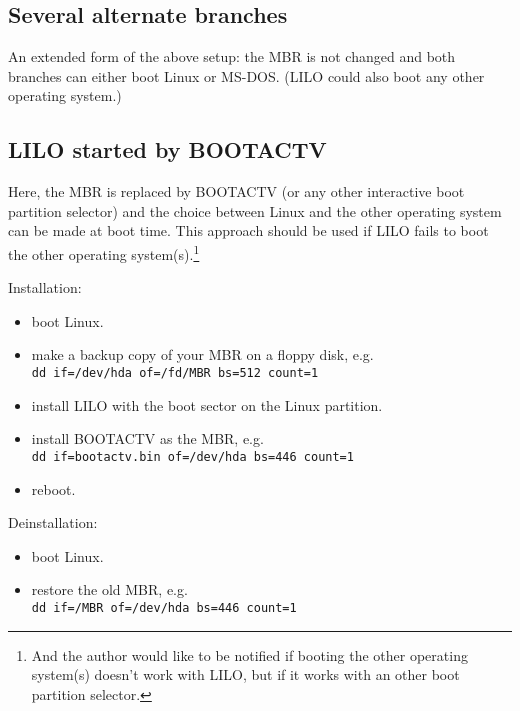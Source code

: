 \subsection{Several alternate branches}


An extended form of the above setup: the MBR is not changed and both branches
can either boot Linux or MS-DOS. (LILO could also boot any other
operating system.)


\subsection{LILO started by BOOTACTV}


Here, the MBR is replaced by BOOTACTV (or any other interactive boot
partition selector) and the choice between Linux and the
other operating system can be made at boot time. This approach should be
used if LILO fails to boot the other operating system(s).\footnote{%
And the author would like to be notified if booting the other operating
system(s) doesn't work with LILO, but if it works with an other boot partition
selector.}

Installation:
\begin{itemize}
  \item boot Linux.
  \item make a backup copy of your MBR on a floppy disk, e.g. \\
    \verb"dd if=/dev/hda of=/fd/MBR bs=512 count=1"
  \item install LILO with the boot sector on the Linux partition.
  \item install BOOTACTV as the MBR, e.g. \\
    \verb"dd if=bootactv.bin of=/dev/hda bs=446 count=1"
  \item reboot.
\end{itemize}

Deinstallation:
\begin{itemize}
  \item boot Linux.
  \item restore the old MBR, e.g. \\
    \verb"dd if=/MBR of=/dev/hda bs=446 count=1"
\end{itemize}

